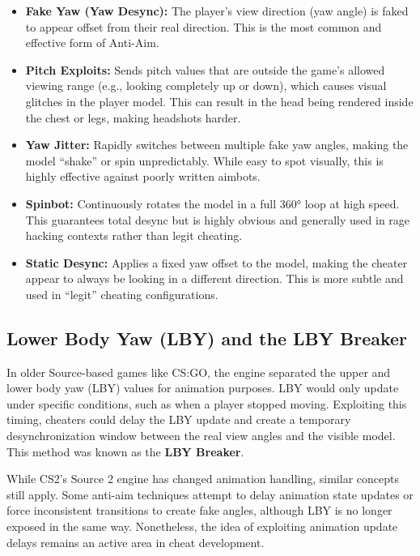 \begin{itemize}
    \item \textbf{Fake Yaw (Yaw Desync):} The player's view direction (yaw angle) is faked to appear offset from their real direction. This is the most common and effective form of Anti-Aim.
    
    \item \textbf{Pitch Exploits:} Sends pitch values that are outside the game's allowed viewing range (e.g., looking completely up or down), which causes visual glitches in the player model. This can result in the head being rendered inside the chest or legs, making headshots harder.
    
    \item \textbf{Yaw Jitter:} Rapidly switches between multiple fake yaw angles, making the model “shake” or spin unpredictably. While easy to spot visually, this is highly effective against poorly written aimbots.
    
    \item \textbf{Spinbot:} Continuously rotates the model in a full 360° loop at high speed. This guarantees total desync but is highly obvious and generally used in rage hacking contexts rather than legit cheating.
    
    \item \textbf{Static Desync:} Applies a fixed yaw offset to the model, making the cheater appear to always be looking in a different direction. This is more subtle and used in “legit” cheating configurations.
\end{itemize}

\subsection{Lower Body Yaw (LBY) and the LBY Breaker}

In older Source-based games like CS:GO, the engine separated the upper and lower body yaw (LBY) values for animation purposes. LBY would only update under specific conditions, such as when a player stopped moving. Exploiting this timing, cheaters could delay the LBY update and create a temporary desynchronization window between the real view angles and the visible model. This method was known as the \textbf{LBY Breaker}.

While CS2’s Source 2 engine has changed animation handling, similar concepts still apply. Some anti-aim techniques attempt to delay animation state updates or force inconsistent transitions to create fake angles, although LBY is no longer exposed in the same way. Nonetheless, the idea of exploiting animation update delays remains an active area in cheat development.

